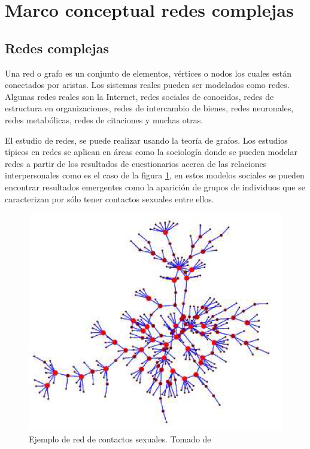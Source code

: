 \section{Marco conceptual redes complejas}
\subsection{Redes complejas}

Una red o grafo\cite{Newman2003}
es un conjunto de elementos, vértices o nodos los cuales están conectados por aristas. Los sistemas reales pueden ser modelados como redes. Algunas redes reales son la Internet, redes sociales de conocidos, redes de estructura en organizaciones, redes de intercambio de bienes, redes neuronales, redes metabólicas, redes de citaciones y muchas otras.

El estudio de redes, se puede realizar usando la teoría de grafos. Los estudios típicos en redes se aplican en áreas como la sociología donde se pueden modelar redes a partir de los resultados de cuestionarios acerca de las relaciones interpersonales como es el caso de la figura \ref{fig:contactosSexuales}, en estos modelos sociales se pueden encontrar resultados emergentes como la aparición de grupos de individuos que se caracterizan por sólo tener contactos sexuales entre ellos.

\begin{figure}[H]
    \centering
    \includegraphics[scale=0.4]{Capitulo2EstadoDelArte/imagenes/contactos.png}
    \caption{Ejemplo de red de contactos sexuales. Tomado de \cite{Newman2003}}
    \label{fig:contactosSexuales}
\end{figure}

